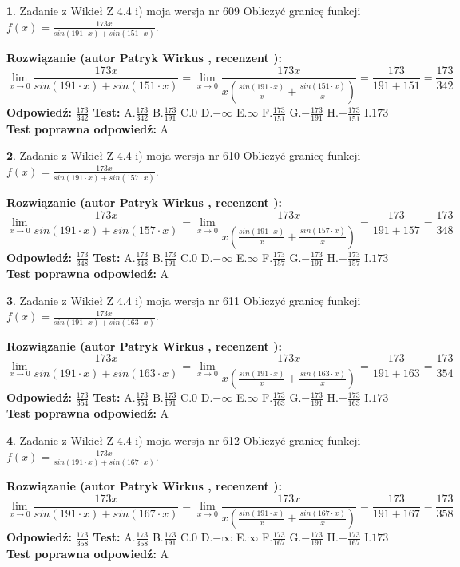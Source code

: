 \documentclass[12pt, a4paper]{article}
\theoremstyle{definition} %
\newtheorem{zad}{}
\newcommand{\zadStart}[1]{\begin{zad}#1\newline}
\newcommand{\zadStop}{\end{zad}}
\newcommand{\rozwStart}[2]{\noindent \textbf{Rozwiązanie (autor #1 , recenzent #2): }\newline}
\newcommand{\rozwStop}{\newline}
\newcommand{\odpStart}{\noindent \textbf{Odpowiedź:}\newline}
\newcommand{\odpStop}{\newline}
\newcommand{\testStart}{\noindent \textbf{Test:}\newline}
\newcommand{\testStop}{\newline}
\newcommand{\kluczStart}{\noindent \textbf{Test poprawna odpowiedź:}\newline}
\newcommand{\kluczStop}{\newline}
\begin{document}
\zadStart{Zadanie z Wikieł Z 4.4 i) moja wersja nr 609}
Obliczyć granicę funkcji $f(x)=\frac{173x}{sin(191\cdot x) +sin(151\cdot x)}$.
\zadStop
\rozwStart{Patryk Wirkus}{}
$$\lim\limits_{x\to 0}\frac{173x}{sin(191\cdot x) +sin(151\cdot x)}=\lim\limits_{x\to 0}\frac{173x}{x(\frac{sin(191\cdot x)}{x}+\frac{sin(151\cdot x)}{x})}=\frac{173}{191+151} = \frac{173}{342}$$
\rozwStop
\odpStart
$\frac{173}{342}$
\odpStop
\testStart
A.$\frac{173}{342}$
B.$\frac{173}{191}$
C.$0$
D.$-\infty$
E.$\infty$
F.$\frac{173}{151}$
G.$-\frac{173}{191}$
H.$-\frac{173}{151}$
I.$173$
\testStop
\kluczStart
A
\kluczStop



\zadStart{Zadanie z Wikieł Z 4.4 i) moja wersja nr 610}
Obliczyć granicę funkcji $f(x)=\frac{173x}{sin(191\cdot x) +sin(157\cdot x)}$.
\zadStop
\rozwStart{Patryk Wirkus}{}
$$\lim\limits_{x\to 0}\frac{173x}{sin(191\cdot x) +sin(157\cdot x)}=\lim\limits_{x\to 0}\frac{173x}{x(\frac{sin(191\cdot x)}{x}+\frac{sin(157\cdot x)}{x})}=\frac{173}{191+157} = \frac{173}{348}$$
\rozwStop
\odpStart
$\frac{173}{348}$
\odpStop
\testStart
A.$\frac{173}{348}$
B.$\frac{173}{191}$
C.$0$
D.$-\infty$
E.$\infty$
F.$\frac{173}{157}$
G.$-\frac{173}{191}$
H.$-\frac{173}{157}$
I.$173$
\testStop
\kluczStart
A
\kluczStop



\zadStart{Zadanie z Wikieł Z 4.4 i) moja wersja nr 611}
Obliczyć granicę funkcji $f(x)=\frac{173x}{sin(191\cdot x) +sin(163\cdot x)}$.
\zadStop
\rozwStart{Patryk Wirkus}{}
$$\lim\limits_{x\to 0}\frac{173x}{sin(191\cdot x) +sin(163\cdot x)}=\lim\limits_{x\to 0}\frac{173x}{x(\frac{sin(191\cdot x)}{x}+\frac{sin(163\cdot x)}{x})}=\frac{173}{191+163} = \frac{173}{354}$$
\rozwStop
\odpStart
$\frac{173}{354}$
\odpStop
\testStart
A.$\frac{173}{354}$
B.$\frac{173}{191}$
C.$0$
D.$-\infty$
E.$\infty$
F.$\frac{173}{163}$
G.$-\frac{173}{191}$
H.$-\frac{173}{163}$
I.$173$
\testStop
\kluczStart
A
\kluczStop



\zadStart{Zadanie z Wikieł Z 4.4 i) moja wersja nr 612}
Obliczyć granicę funkcji $f(x)=\frac{173x}{sin(191\cdot x) +sin(167\cdot x)}$.
\zadStop
\rozwStart{Patryk Wirkus}{}
$$\lim\limits_{x\to 0}\frac{173x}{sin(191\cdot x) +sin(167\cdot x)}=\lim\limits_{x\to 0}\frac{173x}{x(\frac{sin(191\cdot x)}{x}+\frac{sin(167\cdot x)}{x})}=\frac{173}{191+167} = \frac{173}{358}$$
\rozwStop
\odpStart
$\frac{173}{358}$
\odpStop
\testStart
A.$\frac{173}{358}$
B.$\frac{173}{191}$
C.$0$
D.$-\infty$
E.$\infty$
F.$\frac{173}{167}$
G.$-\frac{173}{191}$
H.$-\frac{173}{167}$
I.$173$
\testStop
\kluczStart
A
\kluczStop
\end{document}
